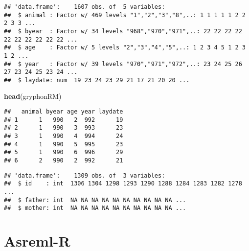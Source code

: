 \documentclass[12pt,]{book}
\newenvironment{Shaded}{\begin{snugshade}}{\end{snugshade}}
\newcommand{\KeywordTok}[1]{\textcolor[rgb]{0.13,0.29,0.53}{\textbf{#1}}}
\newcommand{\NormalTok}[1]{#1}
\newcommand{\OperatorTok}[1]{\textcolor[rgb]{0.81,0.36,0.00}{\textbf{#1}}}
\begin{document}
\begin{verbatim}
## 'data.frame':    1607 obs. of  5 variables:
##  $ animal : Factor w/ 469 levels "1","2","3","8",..: 1 1 1 1 1 2 2 2 3 3 ...
##  $ byear  : Factor w/ 34 levels "968","970","971",..: 22 22 22 22 22 22 22 22 22 22 ...
##  $ age    : Factor w/ 5 levels "2","3","4","5",..: 1 2 3 4 5 1 2 3 1 2 ...
##  $ year   : Factor w/ 39 levels "970","971","972",..: 23 24 25 26 27 23 24 25 23 24 ...
##  $ laydate: num  19 23 24 23 29 21 17 21 20 20 ...
\end{verbatim}

\begin{Shaded}
\begin{Highlighting}[]
\KeywordTok{head}\NormalTok{(gryphonRM)}
\end{Highlighting}
\end{Shaded}

\begin{verbatim}
##   animal byear age year laydate
## 1      1   990   2  992      19
## 2      1   990   3  993      23
## 3      1   990   4  994      24
## 4      1   990   5  995      23
## 5      1   990   6  996      29
## 6      2   990   2  992      21
\end{verbatim}

\begin{verbatim}
## 'data.frame':    1309 obs. of  3 variables:
##  $ id    : int  1306 1304 1298 1293 1290 1288 1284 1283 1282 1278 ...
##  $ father: int  NA NA NA NA NA NA NA NA NA NA ...
##  $ mother: int  NA NA NA NA NA NA NA NA NA NA ...
\end{verbatim}

\begin{Shaded}
\end{Shaded}

\hypertarget{asreml-r-2}{%
\section{Asreml-R}\label{asreml-r-2}}
\end{document}
